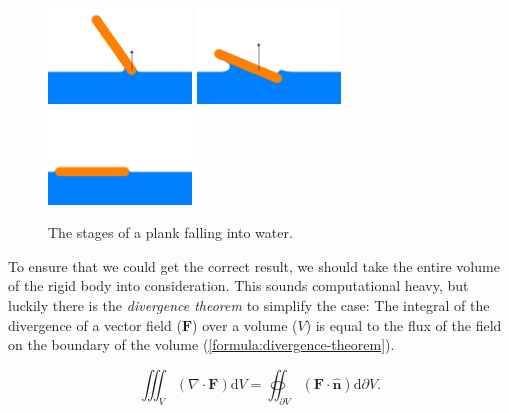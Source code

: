 \documentclass{article}
\begin{document}
\begin{figure}[h]
	\def\ih{1in}
	\centering
	\includegraphics[height=\ih]{../Thesis/figures/stages-of-a-plank-falling-into-water/1.png}
	\includegraphics[height=\ih]{../Thesis/figures/stages-of-a-plank-falling-into-water/2.png}
	\includegraphics[height=\ih]{../Thesis/figures/stages-of-a-plank-falling-into-water/3.png}
	\caption{The stages of a plank falling into water.}
\end{figure}

To ensure that we could get the correct result, we should take the entire volume of the rigid body into consideration.
This sounds computational heavy, but luckily there is the \emph{divergence theorem} to simplify the case:
The integral of the divergence of a vector field ($\mathbf{F}$) over a volume ($V$) is equal to the flux of the field on the boundary of the volume (\ref{formula:divergence-theorem}).

\begin{equation}
	\iiint_{V}(\nabla\cdot\mathbf{F})\mathrm{d}V
	=
	\oiint_{\partial V}\left(\mathbf{F}\cdot\hat{\mathbf{n}}\right)\mathrm{d}\partial V
	.
	\label{formula:divergence-theorem}
\end{equation}
\end{document}
